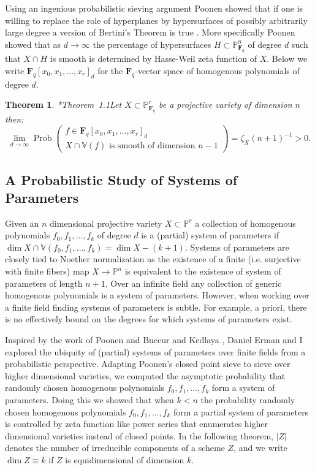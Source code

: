 \documentclass[10pt,reqno]{amsart}
\newtheorem{theorem}[lemma]{Theorem}
\theoremstyle{remark}
\newcommand{\Prob}{\operatorname{Prob}}
\newcommand{\fF}{\mathbf F}
\renewcommand{\P}{\mathbb{P}}
\newcommand{\V}{\mathbb{V}}
\begin{document}
Using an ingenious probabilistic sieving argument Poonen showed that if one is willing to replace the role of hyperplanes by hypersurfaces of possibly arbitrarily large degree a version of Bertini's Theorem is true \cite{poonen04}. More specifically Poonen showed that as $d\to\infty$ the percentage of hypersurfaces $H\subset \P_{\fF_{q}}^{n}$ of degree $d$ such that $X\cap H$ is smooth is determined by Hasse-Weil zeta function of $X$. Below we write $\fF_{q}[x_{0},x_{1},\ldots,x_{r}]_{d}$ for the $\fF_{q}$-vector space of homogenous polynomials of degree $d$. 

\begin{theorem}\cite{poonen04}*{Theorem~1.1}\label{thm:poonen}
Let $X\subset \P^{r}_{\fF_{q}}$ be a projective variety of dimension $n$ then:
\begin{equation}\label{eq:poonen}
\lim_{d\to \infty} \Prob\left(\begin{matrix} f\in \fF_{q}[x_{0},x_{1},\ldots,x_{r}]_{d}\\ \text{$X\cap \V(f)$ is smooth of dimension $n-1$}\end{matrix}\right)=
\zeta_X(n+1)^{-1} >0.
\end{equation}
\end{theorem}


\subsection{A Probabilistic Study of Systems of Parameters} 

Given an $n$ dimensional projective variety $X\subset \P^r$ a collection of homogenous polynomials $f_{0},f_{1},\ldots,f_{k}$ of degree $d$ is a (partial) system of parameters if $\dim X\cap \V(f_{0},f_{1},\ldots,f_{k}) = \dim X - (k+1)$. Systems of parameters are closely tied to Noether normalization as the existence of a finite (i.e. surjective with finite fibers) map $X\rightarrow \P^n$ is equivalent to the existence of system of parameters of length $n+1$. Over an infinite field any collection of generic homogenous polynomials is a system of parameters. However, when working over a finite field finding systems of parameters is subtle. For example, a priori, there is no effectively bound on the degrees for which systems of parameters exist. 

Inspired by the work of Poonen \cite{poonen04} and Buccur and Kedlaya \cite{bucurKedlaya12}, Daniel Erman and I explored the ubiquity of (partial) systems of parameters over finite fields from a probabilistic perspective. Adapting Poonen's closed point sieve to sieve over higher dimensional varieties, we computed the asymptotic probability that randomly chosen homogenous polynomials $f_{0},f_{1},\ldots,f_{k}$ form a system of parameters. Doing this we showed that when $k<n$ the probability randomly chosen homogenous polynomials $f_{0},f_{1},\ldots,f_{k}$ form a partial system of parameters is controlled by zeta function like power series that enumerates higher dimensional varieties instead of closed points. In the following theorem, $|Z|$ denotes the number of irreducible components of a scheme $Z$, and we write $\dim Z \equiv k$ if $Z$ is equidimensional of dimension $k$. 
\end{document}
